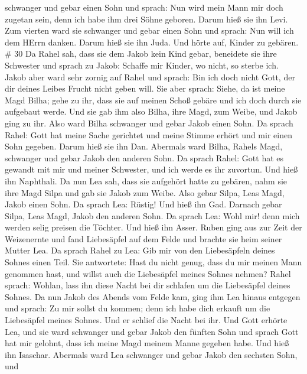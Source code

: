 schwanger und gebar einen Sohn und sprach: Nun wird mein Mann mir doch
zugetan sein, denn ich habe ihm drei Söhne geboren. Darum hieß sie ihn
Levi.  Zum vierten ward sie schwanger und gebar einen Sohn
und sprach: Nun will ich dem HErrn danken. Darum hieß sie ihn Juda. Und
hörte auf, Kinder zu gebären. \# 30  Da Rahel sah, dass sie
dem Jakob kein Kind gebar, beneidete sie ihre Schwester und sprach zu
Jakob: Schaffe mir Kinder, wo nicht, so sterbe ich.  Jakob
aber ward sehr zornig auf Rahel und sprach: Bin ich doch nicht Gott, der
dir deines Leibes Frucht nicht geben will.  Sie aber sprach:
Siehe, da ist meine Magd Bilha; gehe zu ihr, dass sie auf meinen Schoß
gebäre und ich doch durch sie aufgebaut werde.  Und sie gab
ihm also Bilha, ihre Magd, zum Weibe, und Jakob ging zu ihr.
 Also ward Bilha schwanger und gebar Jakob einen Sohn.
 Da sprach Rahel: Gott hat meine Sache gerichtet und meine
Stimme erhört und mir einen Sohn gegeben. Darum hieß sie ihn Dan.
 Abermals ward Bilha, Rahels Magd, schwanger und gebar Jakob
den anderen Sohn.  Da sprach Rahel: Gott hat es gewandt mit
mir und meiner Schwester, und ich werde es ihr zuvortun. Und hieß ihn
Naphthali.  Da nun Lea sah, dass sie aufgehört hatte zu
gebären, nahm sie ihre Magd Silpa und gab sie Jakob zum Weibe.
 Also gebar Silpa, Leas Magd, Jakob einen Sohn.
 Da sprach Lea: Rüstig! Und hieß ihn Gad. 
Darnach gebar Silpa, Leas Magd, Jakob den anderen Sohn.  Da
sprach Lea: Wohl mir! denn mich werden selig preisen die Töchter. Und
hieß ihn Asser.  Ruben ging aus zur Zeit der Weizenernte
und fand Liebesäpfel auf dem Felde und brachte sie heim seiner Mutter
Lea. Da sprach Rahel zu Lea: Gib mir von den Liebesäpfeln deines Sohnes
einen Teil.  Sie antwortete: Hast du nicht genug, dass du
mir meinen Mann genommen hast, und willst auch die Liebesäpfel meines
Sohnes nehmen? Rahel sprach: Wohlan, lass ihn diese Nacht bei dir
schlafen um die Liebesäpfel deines Sohnes.  Da nun Jakob
des Abends vom Felde kam, ging ihm Lea hinaus entgegen und sprach: Zu
mir sollst du kommen; denn ich habe dich erkauft um die Liebesäpfel
meines Sohnes. Und er schlief die Nacht bei ihr.  Und Gott
erhörte Lea, und sie ward schwanger und gebar Jakob den fünften Sohn
 und sprach Gott hat mir gelohnt, dass ich meine Magd
meinem Manne gegeben habe. Und hieß ihn Isaschar.  Abermals
ward Lea schwanger und gebar Jakob den sechsten Sohn,  und
